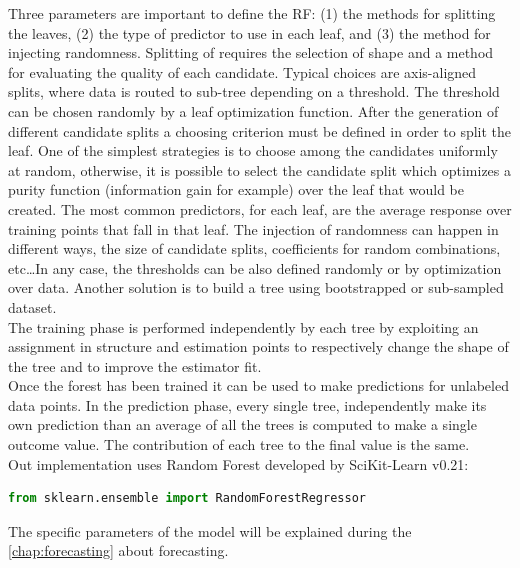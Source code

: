 \documentclass[%
    corpo=12pt,
    twoside,
    oldstyle,
    autoretitolo,
    greek,
    evenboxes,
]{toptesi}
\begin{document}
Three parameters are important to define the RF: (1) the methods for splitting the leaves, (2) the type of predictor to use in each leaf, and (3) the method for injecting randomness.
Splitting of requires the selection of shape and a method for evaluating the quality of each candidate. Typical choices are axis-aligned splits, where data is routed to sub-tree depending on a threshold. The threshold can be chosen randomly by a leaf optimization function. After the generation of different candidate splits a choosing criterion must be defined in order to split the leaf. One of the simplest strategies is to choose among the candidates uniformly at random, otherwise, it is possible to select the candidate split which optimizes a purity function (information gain for example) over the leaf that would be created.
The most common predictors, for each leaf, are the average response over training points that fall in that leaf.
The injection of randomness can happen in different ways, the size of candidate splits, coefficients for random combinations, etc\dots In any case, the thresholds can be also defined randomly or by optimization over data. Another solution is to build a tree using bootstrapped or sub-sampled dataset.\\
The training phase is performed independently by each tree by exploiting an assignment in structure and estimation points to respectively change the shape of the tree and to improve the estimator fit.\\
Once the forest has been trained it can be used to make predictions for unlabeled data points. In the prediction phase, every single tree, independently make its own prediction than an average of all the trees is computed to make a single outcome value. The contribution of each tree to the final value is the same.\\
Out implementation uses Random Forest developed by SciKit-Learn v0.21:
\begin{lstlisting}[language=python, frame=single]
  from sklearn.ensemble import RandomForestRegressor
\end{lstlisting}
The specific parameters of the model will be explained during the \autoref{chap:forecasting} about forecasting.
\end{document}
